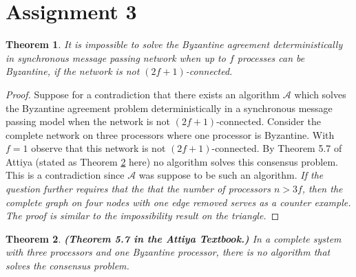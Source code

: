 \documentclass[11pt]{article}
\newcommand\A{\mathcal{A}}
\newtheorem{theorem}{Theorem}
\begin{document}
\rhead{\today}

\section*{Assignment 3}
\begin{theorem}
\label{thm:byzantinenotpossible}
It is impossible to solve the Byzantine agreement deterministically in synchronous message passing network when up to $f$ processes can be Byzantine, if the network is not $(2f+1)$-connected.
\end{theorem}
\begin{proof}
Suppose for a contradiction that there exists an algorithm $\A$ which solves the Byzantine agreement problem deterministically in a synchronous message passing model when the network is not $(2f+1)$-connected. Consider the complete network on three processors where one processor is Byzantine. With $f = 1$ observe that this network is not $(2f+1)$-connected. By Theorem 5.7 of Attiya (stated as Theorem \ref{thm:Bthreeprocessors} here) no algorithm solves this consensus problem. This is a contradiction since $\A$ was suppose to be such an algorithm. \emph{If the question further requires that the that the number of processors $n > 3f$, then the complete graph on four nodes with one edge removed serves as a counter example. The proof is similar to the impossibility result on the triangle.}
\end{proof}

\begin{theorem}
\label{thm:Bthreeprocessors}
\textbf{(Theorem 5.7 in the Attiya Textbook.)} In a complete system with three processors and one Byzantine processor, there is no algorithm that solves the consensus problem.  
\end{theorem}
\end{document}
